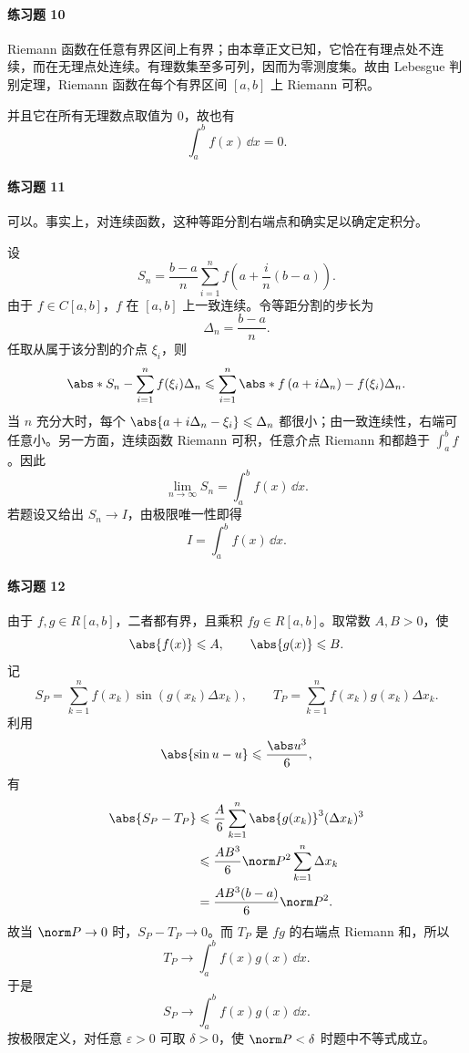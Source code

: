 \paragraph{练习题 10}
\begin{xsolution}
Riemann 函数在任意有界区间上有界；由本章正文已知，它恰在有理点处不连续，而在无理点处连续。有理数集至多可列，因而为零测度集。故由 Lebesgue 判别定理，Riemann 函数在每个有界区间 $[a,b]$ 上 Riemann 可积。

并且它在所有无理数点取值为 $0$，故也有
\[
  \int_a^b f(x)\,\dd x=0.
\]
\end{xsolution}

\paragraph{练习题 11}
\begin{xsolution}
可以。事实上，对连续函数，这种等距分割右端点和确实足以确定定积分。

设
\[
  S_n=\frac{b-a}{n}\sum_{i=1}^n
  f\left(a+\frac{i}{n}(b-a)\right).
\]
由于 $f\in C[a,b]$，$f$ 在 $[a,b]$ 上一致连续。令等距分割的步长为
\[
  \Delta_n=\frac{b-a}{n}.
\]
任取从属于该分割的介点 $\xi_i$，则
\[
  \abs*{S_n-\sum_{i=1}^n f(\xi_i)\Delta_n}
  \leqslant
  \sum_{i=1}^n
  \abs*{f\left(a+i\Delta_n\right)-f(\xi_i)}\Delta_n.
\]
当 $n$ 充分大时，每个 $\abs{a+i\Delta_n-\xi_i}\leqslant\Delta_n$ 都很小；由一致连续性，右端可任意小。另一方面，连续函数 Riemann 可积，任意介点 Riemann 和都趋于 $\int_a^b f$。因此
\[
  \lim_{n\to\infty}S_n=\int_a^b f(x)\,\dd x.
\]
若题设又给出 $S_n\to I$，由极限唯一性即得
\[
  I=\int_a^b f(x)\,\dd x.
\]
\end{xsolution}

\paragraph{练习题 12}
\begin{xsolution}
由于 $f,g\in R[a,b]$，二者都有界，且乘积 $fg\in R[a,b]$。取常数 $A,B>0$，使
\[
  \abs{f(x)}\leqslant A,
  \qquad
  \abs{g(x)}\leqslant B.
\]
记
\[
  S_P=\sum_{k=1}^n f(x_k)\sin(g(x_k)\Delta x_k),
  \qquad
  T_P=\sum_{k=1}^n f(x_k)g(x_k)\Delta x_k.
\]
利用
\[
  \abs{\sin u-u}\leqslant\frac{\abs u^3}{6},
\]
有
\begin{align*}
  \abs{S_P-T_P}
  &\leqslant\frac{A}{6}\sum_{k=1}^n
    \abs{g(x_k)}^3(\Delta x_k)^3\\
  &\leqslant\frac{AB^3}{6}\norm P^2\sum_{k=1}^n\Delta x_k\\
  &=\frac{AB^3(b-a)}6\norm P^2.
\end{align*}
故当 $\norm P\to0$ 时，$S_P-T_P\to0$。而 $T_P$ 是 $fg$ 的右端点 Riemann 和，所以
\[
  T_P\to\int_a^b f(x)g(x)\,\dd x.
\]
于是
\[
  S_P\to\int_a^b f(x)g(x)\,\dd x.
\]
按极限定义，对任意 $\varepsilon>0$ 可取 $\delta>0$，使 $\norm P<\delta$ 时题中不等式成立。
\end{xsolution}

